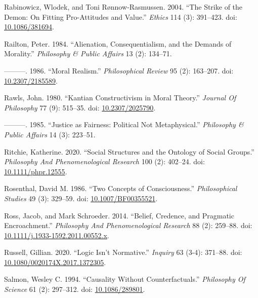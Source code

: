 \documentclass[
  10pt,
  letterpaper,
  DIV=11,
  numbers=noendperiod,
  twoside]{scrartcl}
\newlength{\cslhangindent}
\newenvironment{CSLReferences}[2] %
 {\begin{list}{}{%
  \setlength{\itemindent}{0pt}
  \setlength{\leftmargin}{0pt}
  \setlength{\parsep}{0pt}
  \ifodd #1
   \setlength{\leftmargin}{\cslhangindent}
   \setlength{\itemindent}{-1\cslhangindent}
  \fi
  \setlength{\itemsep}{#2\baselineskip}}}
 {\end{list}}
\begin{document}
\begin{CSLReferences}{1}{0}
Rabinowicz, Wlodek, and Toni Rønnow‐Rasmussen. 2004. {``The Strike of
the Demon: On Fitting Pro-Attitudes and Value.''} \emph{Ethics} 114 (3):
391--423. doi: \href{https://doi.org/10.1086/381694}{10.1086/381694}.

Railton, Peter. 1984. {``Alienation, Consequentialism, and the Demands
of Morality.''} \emph{Philosophy \& Public Affairs} 13 (2): 134--71.

---------. 1986. {``Moral Realism.''} \emph{Philosophical Review} 95
(2): 163--207. doi:
\href{https://doi.org/10.2307/2185589}{10.2307/2185589}.

Rawls, John. 1980. {``Kantian Constructivism in Moral Theory.''}
\emph{Journal Of Philosophy} 77 (9): 515--35. doi:
\href{https://doi.org/10.2307/2025790}{10.2307/2025790}.

---------. 1985. {``Justice as Fairness: Political Not Metaphysical.''}
\emph{Philosophy \& Public Affairs} 14 (3): 223--51.

Ritchie, Katherine. 2020. {``Social Structures and the Ontology of
Social Groups.''} \emph{Philosophy And Phenomenological Research} 100
(2): 402--24. doi:
\href{https://doi.org/10.1111/phpr.12555}{10.1111/phpr.12555}.

Rosenthal, David M. 1986. {``Two Concepts of Consciousness.''}
\emph{Philosophical Studies} 49 (3): 329--59. doi:
\href{https://doi.org/10.1007/BF00355521}{10.1007/BF00355521}.

Ross, Jacob, and Mark Schroeder. 2014. {``Belief, Credence, and
Pragmatic Encroachment.''} \emph{Philosophy And Phenomenological
Research} 88 (2): 259--88. doi:
\href{https://doi.org/10.1111/j.1933-1592.2011.00552.x}{10.1111/j.1933-1592.2011.00552.x}.

Russell, Gillian. 2020. {``Logic Isn't Normative.''} \emph{Inquiry} 63
(3-4): 371--88. doi:
\href{https://doi.org/10.1080/0020174X.2017.1372305}{10.1080/0020174X.2017.1372305}.

Salmon, Wesley C. 1994. {``Causality Without Counterfactuals.''}
\emph{Philosophy Of Science} 61 (2): 297--312. doi:
\href{https://doi.org/10.1086/289801}{10.1086/289801}.


\end{CSLReferences}
\end{document}
